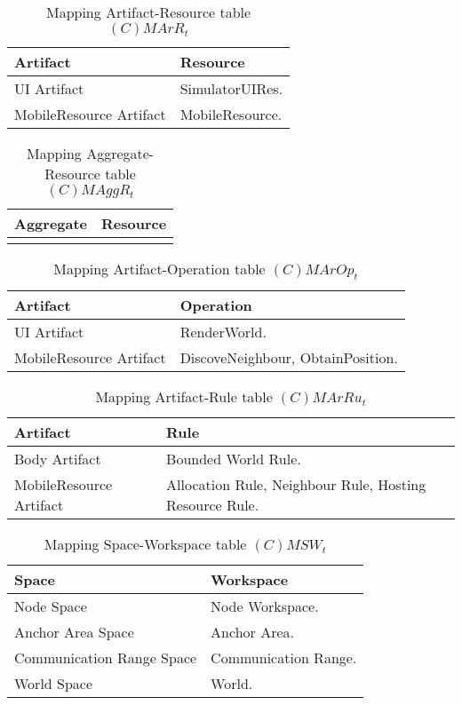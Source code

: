 \begin{table}[H]
	\centering
	\begin{tabular}{|p{4cm}|p{8cm}|}
			\hline
			\textbf{Artifact} & \textbf{Resource} \\
			\hline
			UI Artifact & SimulatorUIRes. \\
			\hline
			MobileResource Artifact & MobileResource. \\
			\hline
		\end{tabular}
	\caption{Mapping Artifact-Resource table $(C)MArR_t$}
	\label{tab:cmarrt}
\end{table}

\begin{table}[H]
	\centering
	\begin{tabular}{|p{4cm}|p{8cm}|}
			\hline
			\textbf{Aggregate} & \textbf{Resource} \\
			\hline
			& \\
			\hline
		\end{tabular}
	\caption{Mapping Aggregate-Resource table $(C)MAggR_t$}
	\label{tab:cmaggrt}
\end{table}

\begin{table}[H]
	\centering
	\begin{tabular}{|p{4cm}|p{8cm}|}
			\hline
			\textbf{Artifact} & \textbf{Operation} \\
			\hline
			UI Artifact & RenderWorld. \\
			\hline
      MobileResource Artifact & DiscoveNeighbour,  ObtainPosition. \\
			\hline
		\end{tabular}
	\caption{Mapping Artifact-Operation table $(C)MArOp_t$}
	\label{tab:cmaropt}
\end{table}

\begin{table}[H]
	\centering
	\begin{tabular}{|p{4cm}|p{8cm}|}
			\hline
			\textbf{Artifact} & \textbf{Rule} \\
			\hline
			Body Artifact & Bounded World Rule. \\
			\hline
      MobileResource Artifact & Allocation Rule, Neighbour Rule, Hosting
      Resource Rule. \\
			\hline
		\end{tabular}
	\caption{Mapping Artifact-Rule table $(C)MArRu_t$}
	\label{tab:cmarrut}
\end{table}

\begin{table}[H]
	\centering
	\begin{tabular}{|p{4cm}|p{8cm}|}
			\hline
			\textbf{Space} & \textbf{Workspace} \\
			\hline
			Node Space & Node Workspace. \\
			\hline
			Anchor Area Space & Anchor Area. \\
			\hline
			Communication Range Space & Communication Range.\\
			\hline
			World Space & World. \\
			\hline
		\end{tabular}
	\caption{Mapping Space-Workspace table $(C)MSW_t$}
	\label{tab:cmsrt}
\end{table}

